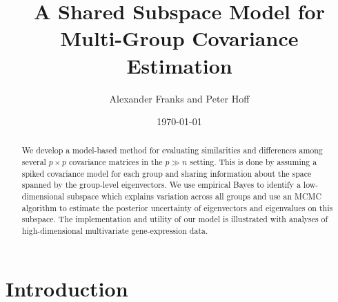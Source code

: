 \documentclass[12pt]{article}
\begin{document}
\title{A Shared Subspace Model for Multi-Group Covariance Estimation}
\author{Alexander Franks and Peter Hoff}
\date{\today}
\maketitle 

\begin{abstract}


  We develop a model-based method for evaluating similarities and
  differences among several $p\times p$ covariance matrices in the
  $p \gg n$ setting.  This is done by assuming a spiked covariance
  model for each group and sharing information about the space spanned
  by the group-level eigenvectors.  We use empirical Bayes to identify
  a low-dimensional subspace which explains variation across all
  groups and use an MCMC algorithm to estimate the posterior
  uncertainty of eigenvectors and eigenvalues on this subspace.  The
  implementation and utility of our model is illustrated with analyses
  of high-dimensional multivariate gene-expression data.

\end{abstract}

\section{Introduction}



\end{document}
